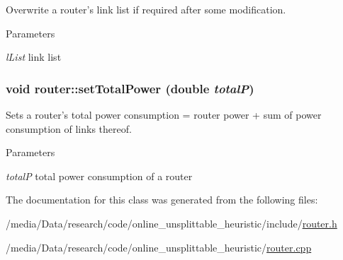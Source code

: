 Overwrite a router's link list if required after some modification. 


\begin{DoxyParams}{Parameters}
\item[{\em lList}]link list \end{DoxyParams}
\hypertarget{classrouter_a9b06f4e341fea7bf5a853b0a2caf1d2a}{
\subsubsection[{setTotalPower}]{\setlength{\rightskip}{0pt plus 5cm}void router::setTotalPower (double {\em totalP})}}
\label{classrouter_a9b06f4e341fea7bf5a853b0a2caf1d2a}


Sets a router's total power consumption = router power + sum of power consumption of links thereof. 


\begin{DoxyParams}{Parameters}
\item[{\em totalP}]total power consumption of a router \end{DoxyParams}


The documentation for this class was generated from the following files:\begin{DoxyCompactItemize}
\item 
/media/Data/research/code/online\_\-unsplittable\_\-heuristic/include/\hyperlink{router_8h}{router.h}\item 
/media/Data/research/code/online\_\-unsplittable\_\-heuristic/\hyperlink{router_8cpp}{router.cpp}\end{DoxyCompactItemize}
